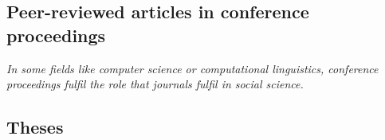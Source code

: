 \documentclass[11pt,a4paper,sans]{moderncv}
\begin{document}


\subsection{Peer-reviewed articles in conference proceedings}
\emph{In some fields like computer science or computational linguistics, conference proceedings fulfil the role that journals fulfil in social science.}

\makeatletter
\long{}
\def\endthebibliography{\end{etaremune}}
\def\@bibitem#1{%
  \item \if@filesw\immediate\write\@auxout{\string\bibcite{#1}{\the\value{enumi}}}\fi\ignorespaces
}
\makeatother






\subsection{Theses}


\makeatletter
\long{}
\def\endthebibliography{\end{etaremune}}
\def\@bibitem#1{%
  \item \if@filesw\immediate\write\@auxout{\string\bibcite{#1}{\the\value{enumi}}}\fi\ignorespaces
}
\makeatother
\end{document}
